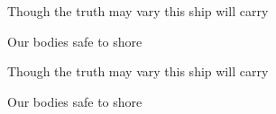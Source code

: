 \begin{song}
\bigskip

\Chorus {}

\bigskip

 \par
Though the truth may vary this  ship will carry \par
Our bodies safe to shore  \par
Though the truth may vary this  ship will carry \par
Our bodies safe to shore  \par

\end{song}
